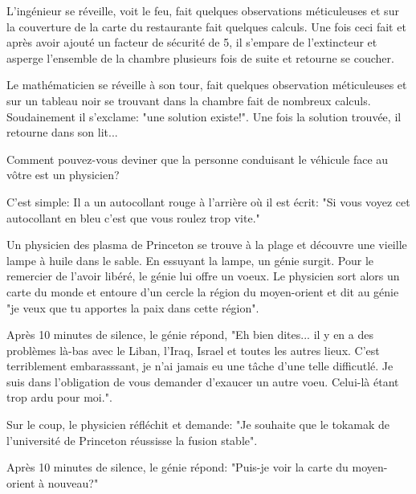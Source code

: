 L'ingénieur se réveille, voit le feu, fait quelques observations méticuleuses et sur la couverture de la carte du restaurante fait quelques calculs. Une fois ceci fait et après avoir ajouté un facteur de sécurité de 5, il s'empare de l'extincteur et asperge l'ensemble de la chambre plusieurs fois de suite et retourne se coucher.

Le mathématicien se réveille à son tour, fait quelques observation méticuleuses et sur un tableau noir se trouvant dans la chambre fait de nombreux calculs. Soudainement il s'exclame: "une solution existe!". Une fois la solution trouvée, il retourne dans son lit...

	\begin{center}\underline{\hspace{5 cm}}\end{center}

Comment pouvez-vous deviner que la personne conduisant le véhicule face au vôtre est un physicien?

C'est simple: Il a un autocollant rouge à l'arrière où il est écrit: "Si vous voyez cet autocollant en bleu c'est que vous roulez trop vite."

	\begin{center}\underline{\hspace{5 cm}}\end{center}

Un physicien des plasma de Princeton se trouve à la plage et découvre une vieille lampe à huile dans le sable. En essuyant la lampe, un génie surgit. Pour le remercier de l'avoir libéré, le génie lui offre un voeux. Le physicien sort alors un carte du monde et entoure d'un cercle la région du moyen-orient et dit au génie "je veux que tu apportes la paix dans cette région".

Après 10 minutes de silence, le génie répond, "Eh bien dites... il y en a des problèmes là-bas avec le Liban, l'Iraq, Israel et toutes les autres lieux. C'est terriblement embarasssant, je n'ai jamais eu une tâche d'une telle difficutlé. Je suis dans l'obligation de vous demander d'exaucer un autre voeu. Celui-là étant trop ardu pour moi.".

Sur le coup, le physicien réfléchit et demande: "Je souhaite que le tokamak de l'université de Princeton réussisse la fusion stable".

Après 10 minutes de silence, le génie répond: "Puis-je voir la carte du moyen-orient à nouveau?"

	\begin{center}\underline{\hspace{5 cm}}\end{center}

